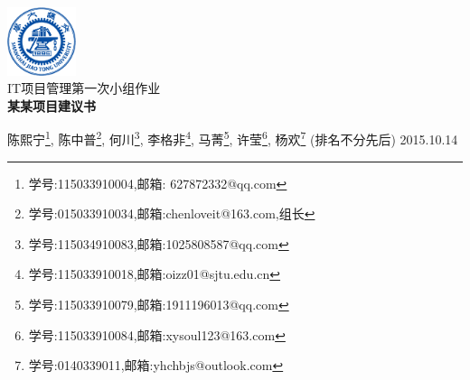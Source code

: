 \begin{titlepage}

\begin{center} 
 
\includegraphics[width=0.15\textwidth]{sjtulogo}\\[1cm]  

\textsc{\Large IT项目管理第一次小组作业}\\[1cm]

{\huge \bfseries 某某项目建议书}\\[0.4cm] 

\vspace*{2\baselineskip}

陈熙宁\footnote{学号:115033910004,邮箱: 627872332@qq.com},
陈中普\footnote{学号:015033910034,邮箱:chenloveit@163.com,组长},
何川\footnote{学号:115034910083,邮箱:1025808587@qq.com},
李格非\footnote{学号:115033910018,邮箱:oizz01@sjtu.edu.cn},
马菁\footnote{学号:115033910079,邮箱:1911196013@qq.com},
许莹\footnote{学号:115033910084,邮箱:xysoul123@163.com},
杨欢\footnote{学号:0140339011,邮箱:yhchbjs@outlook.com}
(排名不分先后)
\vfill
{\large 2015.10.14}\\[3cm]
\end{center}
\end{titlepage}
